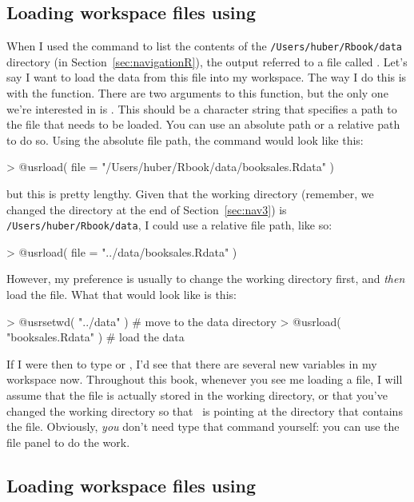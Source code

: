 \subsection{Loading workspace files using \R}

When I used the  command to list the contents of the \verb#/Users/huber/Rbook/data# directory (in Section~\ref{sec:navigationR}), the output referred to a file called . Let's say I want to load the data from this file into my workspace. The way I do this is with the  function. There are two arguments to this function, but the only one we're interested in is . This should be a character string that specifies a path to the file that needs to be loaded. You can use an absolute path or a relative path to do so.
Using the absolute file path, the command would look like this:
\begin{rblock1}
> @usr{load( file = "/Users/huber/Rbook/data/booksales.Rdata" )}
\end{rblock1}
but this is pretty lengthy. Given that the working directory (remember, we changed the directory at the end of Section~\ref{sec:nav3}) is \verb#/Users/huber/Rbook/data#, I could use a relative file path, like so:
\begin{rblock1}
> @usr{load( file = "../data/booksales.Rdata" )}
\end{rblock1}
However, my preference is usually to change the working directory first, and {\it then} load the file. What that would look like is this:
\begin{rblock1}
> @usr{setwd( "../data" )}         # move to the data directory
> @usr{load( "booksales.Rdata" )}  # load the data
\end{rblock1}
If I were then to type  or , I'd see that there are several new variables in my workspace now.  Throughout this book, whenever you see me loading a file, I will assume that the file is actually stored in the working directory, or that you've changed the working directory so that \R\ is pointing at the directory that contains the file. Obviously, {\it you} don't need type that command yourself: you can use the \Rstudio file panel to do the work.

\subsection{Loading workspace files using \Rstudio}

